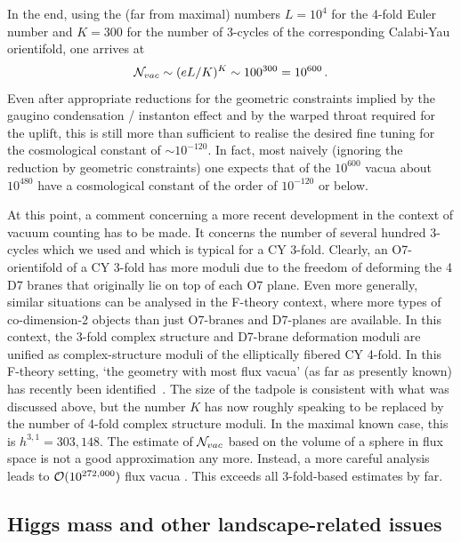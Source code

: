 \documentclass[12pt]{article}
\newcommand{\be}{\begin{equation}}
\newcommand{\ee}{\end{equation}}
\numberwithin{equation}{section}
\begin{document}
In the end, using the (far from maximal) numbers $L=10^4$ for the 4-fold Euler number and $K=300$ for the number of 3-cycles of the corresponding Calabi-Yau orientifold, one arrives at
\be
{\cal N}_{vac}\sim (eL/K)^K\sim 100^{300}= 10^{600}\,.
\ee
Even after appropriate reductions for the geometric constraints implied by the gaugino condensation / instanton effect and by the warped throat required for the uplift, this is still more than sufficient to realise the desired fine tuning for the cosmological constant of $\sim 10^{-120}$. In fact, most naively (ignoring the reduction by geometric constraints) one expects that of the $10^{600}$ vacua about $10^{480}$ have a cosmological constant of the order of $10^{-120}$ or below.

At this point, a comment concerning a more recent development in the context of vacuum counting has to be made. It concerns the number of several hundred 3-cycles which we used and which is typical for a CY 3-fold. Clearly, an O7-orientifold of a CY 3-fold has more moduli due to the freedom of deforming the 4 D7 branes that originally lie on top of each O7 plane. Even more generally, similar situations can be analysed in the F-theory context, where more types of co-dimension-2 objects than just O7-branes and D7-planes are available. In this context, the 3-fold complex structure and D7-brane deformation moduli are unified as complex-structure moduli of the elliptically fibered CY 4-fold. In this F-theory setting, `the geometry with most flux vacua' (as far as presently known) has recently been identified~\cite{Taylor:2015xtz}. The size of the tadpole is consistent with what was discussed above, but the number $K$ has now roughly speaking to be replaced by the number of 4-fold complex structure moduli. In the maximal known case, this is $h^{3,1}=303,148$. The estimate of ${\cal N}_{vac}$ based on the volume of a sphere in flux space is not a good approximation any more. Instead, a more careful analysis leads to ${\cal O}(10^{272,000})$ flux vacua \cite{Taylor:2015xtz}. This exceeds all 3-fold-based estimates by far.







\subsection{Higgs mass and other landscape-related issues}
\end{document}
